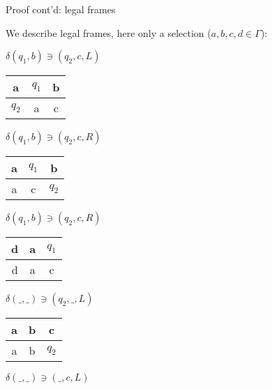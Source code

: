 \documentclass[handout]{beamer}
\begin{document}
\begin{frame}{Proof cont'd: legal frames}

    \vspace{-3pt}
    We describe \alert{legal frames}, here only a selection ($a,b,c,d\in \Gamma$):

    \begin{center}
        
        \begin{minipage}{0.32\textwidth}
            $\delta(q_1,b)\ni (q_2,c,L)$
    
            \begin{tabular}{|c|c|c|}\hline
                a & $q_1$ & b\\\hline
                $q_2$ & a & c\\\hline
            \end{tabular}
        \end{minipage}
        \begin{minipage}{0.32\textwidth}
            $\delta(q_1,b)\ni (q_2,c,R)$
    
            \begin{tabular}{|c|c|c|}\hline
                a & $q_1$ & b\\\hline
                a & c & $q_2$ \\\hline
            \end{tabular}
        \end{minipage}
        \begin{minipage}{0.32\textwidth}
            $\delta(q_1,b)\ni (q_2,c,R)$
    
            \begin{tabular}{|c|c|c|}\hline
                d & a & $q_1$ \\\hline
                d & a & c  \\\hline
            \end{tabular}
        \end{minipage}
    
        \medskip
    
        \begin{minipage}{0.32\textwidth}
            $\delta(\_,\_)\ni (q_2,\_,L)$
    
            \begin{tabular}{|c|c|c|}\hline
                a & b & c\\\hline
                a & b & $q_2$ \\\hline
            \end{tabular}
        \end{minipage}
        \begin{minipage}{0.32\textwidth}
            $\delta(\_,\_)\ni (\_,c,L)$
    

\end{minipage}
\end{center}
\end{frame}
\end{document}
